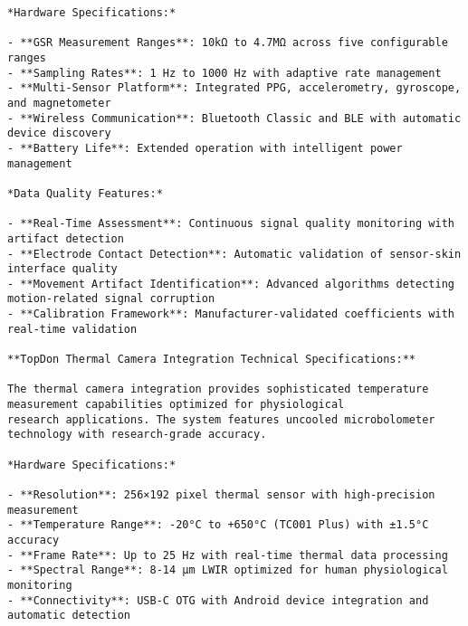 \documentclass[12pt,a4paper]{report}
\begin{document}
\begin{verbatim}
*Hardware Specifications:*

- **GSR Measurement Ranges**: 10kΩ to 4.7MΩ across five configurable ranges
- **Sampling Rates**: 1 Hz to 1000 Hz with adaptive rate management
- **Multi-Sensor Platform**: Integrated PPG, accelerometry, gyroscope, and magnetometer
- **Wireless Communication**: Bluetooth Classic and BLE with automatic device discovery
- **Battery Life**: Extended operation with intelligent power management

*Data Quality Features:*

- **Real-Time Assessment**: Continuous signal quality monitoring with artifact detection
- **Electrode Contact Detection**: Automatic validation of sensor-skin interface quality
- **Movement Artifact Identification**: Advanced algorithms detecting motion-related signal corruption
- **Calibration Framework**: Manufacturer-validated coefficients with real-time validation

**TopDon Thermal Camera Integration Technical Specifications:**

The thermal camera integration provides sophisticated temperature measurement capabilities optimized for physiological
research applications. The system features uncooled microbolometer technology with research-grade accuracy.

*Hardware Specifications:*

- **Resolution**: 256×192 pixel thermal sensor with high-precision measurement
- **Temperature Range**: -20°C to +650°C (TC001 Plus) with ±1.5°C accuracy
- **Frame Rate**: Up to 25 Hz with real-time thermal data processing
- **Spectral Range**: 8-14 μm LWIR optimized for human physiological monitoring
- **Connectivity**: USB-C OTG with Android device integration and automatic detection

*Processing Capabilities:*

- **Real-Time Calibration**: Manufacturer-validated coefficients with environmental compensation
- **Temperature ROI Analysis**: Multi-point measurement with region-specific analysis
- **Thermal Data Export**: Raw thermal data access with processed temperature matrices
- **Quality Assessment**: Automated emissivity correction and atmospheric compensation

**Testing and Quality Assurance Framework Technical Specifications:**

The testing framework implements comprehensive multi-layered validation with sophisticated statistical analysis and
confidence interval estimation. The system provides systematic validation from component level through complete system
integration.


\end{verbatim}
\end{document}
